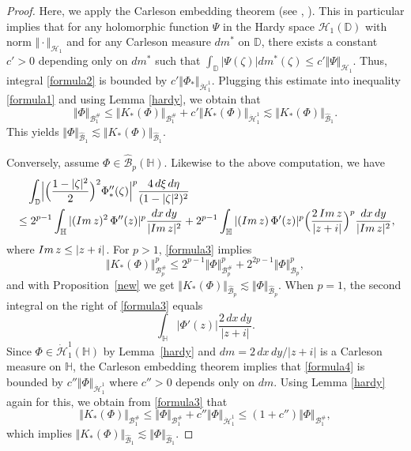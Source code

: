 \documentclass[amstex,12pt,reqno]{amsart}
\theoremstyle{definition}
\begin{document}
\begin{proof}
Here, we apply the Carleson embedding theorem (see \cite[Theorem 9.3]{Du}, \cite[Theorem II.3.9]{Ga}).
This in particular implies that for any holomorphic function $\Psi$ in the Hardy space ${\mathcal H}_1(\mathbb D)$ 
with norm $\Vert \cdot \Vert_{\mathcal H_1}$ 
and for any Carleson measure $dm^*$ on $\mathbb D$, there exists a constant $c'>0$ depending only on $dm^*$ such that
$\int_{\mathbb D} |\Psi(\zeta)|dm^*(\zeta) \leq c' \Vert \Psi \Vert_{\mathcal H_1}$. Thus,
integral \eqref{formula2} is bounded by $c' \Vert \Phi_* \Vert_{\dot{\mathcal H}^1_1}$.
Plugging this estimate into inequality \eqref{formula1} and using Lemma \ref{hardy}, we obtain that
$$
\Vert \Phi \Vert_{{\mathcal B}_1^{\#}} \leq \Vert K_*(\Phi) \Vert_{{\mathcal B}_1^{\#}}+c'\Vert K_*(\Phi) \Vert_{\dot{\mathcal H}^1_1}
\lesssim \Vert K_*(\Phi) \Vert_{\widehat{\mathcal B}_1}.
$$
This yields $\Vert \Phi \Vert_{\widehat{\mathcal B}_1} \lesssim \Vert K_*(\Phi) \Vert_{\widehat{\mathcal B}_1}$.

Conversely, assume $\Phi \in \widehat{\mathcal B}_p(\mathbb H)$. Likewise to the above computation, we have
\begin{align}\label{formula3}
& \quad \int_{\mathbb D} \Bigl|\Bigl(\frac{1-|\zeta|^2}{2}\Bigr)^2\Phi_*''(\zeta)\Bigr|^p \frac{4\,d\xi\,d\eta}{(1-|\zeta|^2)^2} \notag \\
& \leq 2^{p-1}\int_{\mathbb H} |({\rm Im}\,z)^2\,\Phi''(z)|^p\frac{dx\,dy}{|{\rm Im}\,z|^2}
+2^{p-1}\int_{\mathbb H}|({\rm Im}\,z)\,\Phi'(z)|^p \Bigl(\frac{2\,{\rm Im}\,z}{|z+i|}\Bigr)^{p}\frac{dx\,dy}{|{\rm Im}\,z|^2},
\end{align}
where ${\rm Im}\,z \le |z+i|$. For $p>1$, \eqref{formula3} implies
$$
\Vert K_*(\Phi) \Vert_{{\mathcal B}_p^{\#}}^p \leq 2^{p-1}\Vert \Phi \Vert_{{\mathcal B}_p^{\#}}^p
+2^{2p-1}\Vert \Phi \Vert_{{\mathcal B}_p}^p,
$$
and with Proposition~\ref{new} we get $\Vert K_*(\Phi) \Vert_{\widehat{\mathcal B}_p} \lesssim \Vert \Phi \Vert_{\widehat{\mathcal B}_p}$.
When $p=1$, the second integral on the right of \eqref{formula3} equals
\begin{equation}\label{formula4}
\int_{\mathbb H}|\Phi'(z)| 
\frac{2\,dx\,dy}{|z+i|}.  
\end{equation}
Since $\Phi \in \dot {\mathcal H}_1^1(\mathbb H)$ by Lemma~\ref{hardy} and $dm=2\,dx\,dy/|z+i|$ is a Carleson measure on $\mathbb H$, the Carleson embedding theorem implies that
\eqref{formula4} is bounded by $c''\Vert \Phi \Vert_{\dot{\mathcal H}^1_1}$ where $c''>0$ depends only on $dm$.
Using Lemma \ref{hardy} again for this, we obtain from \eqref{formula3} that
\begin{equation}\label{formula5}
\Vert K_*(\Phi) \Vert_{{\mathcal B}_1^{\#}} \leq \Vert \Phi \Vert_{{\mathcal B}_1^{\#}}
+c''\Vert \Phi \Vert_{\dot{\mathcal H}^1_1} \leq (1+c'')\Vert \Phi \Vert_{{\mathcal B}_1^{\#}},
\end{equation}
which implies $\Vert K_*(\Phi)  \Vert_{\widehat{\mathcal B}_1} \lesssim \Vert \Phi \Vert_{\widehat{\mathcal B}_1}$.
\end{proof}
\end{document}
